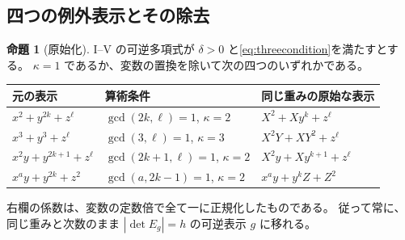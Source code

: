 \documentclass[11pt,a4paper]{ltjsarticle}
\numberwithin{equation}{section}
\theoremstyle{definition}
\newtheorem{proposition}[theorem]{命題}
\begin{document}
\subsection{四つの例外表示とその除去}
\begin{proposition}[原始化]\label{prop:mutation}
I--V の可逆多項式が $\delta>0$ と\eqref{eq:threecondition}を満たすとする。
$\kappa=1$ であるか、変数の置換を除いて次の四つのいずれかである。
\begin{center}\small
\begin{tabular}{lll}
\toprule
元の表示 & 算術条件 & 同じ重みの原始な表示\\\midrule
$x^2+y^{2k}+z^\ell$ & $\gcd(2k,\ell)=1$, $\kappa=2$ & $X^2+Xy^k+z^\ell$\\
$x^3+y^3+z^\ell$ & $\gcd(3,\ell)=1$, $\kappa=3$ & $X^2Y+XY^2+z^\ell$\\
$x^2y+y^{2k+1}+z^\ell$ & $\gcd(2k+1,\ell)=1$, $\kappa=2$ & $X^2y+Xy^{k+1}+z^\ell$\\
$x^ay+y^{2k}+z^2$ & $\gcd(a,2k-1)=1$, $\kappa=2$ & $x^ay+y^kZ+Z^2$\\\bottomrule
\end{tabular}
\end{center}
右欄の係数は、変数の定数倍で全て一に正規化したものである。
従って常に、同じ重みと次数のまま $|\det E_g|=h$ の可逆表示 $g$ に移れる。
\end{proposition}
\end{document}
